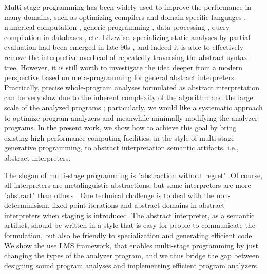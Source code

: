 Multi-stage programming has been widely used to improve the performance in many domains, 
such as optimizing compilers and domain-specific languages \cite{DBLP:conf/pldi/RompfSBLCO14, DBLP:conf/snapl/RompfBLSJAOSKDK15,
DBLP:journals/tecs/SujeethBLRCOO14, DBLP:conf/gpce/SujeethGBLROO13, DBLP:journals/jfp/CaretteKS09},
numerical computation \cite{PGL-038, DBLP:conf/pepm/AktemurKKS13}, 
generic programming \cite{DBLP:journals/pacmpl/Yallop17, Ofenbeck:2017:SGP:3136040.3136060}, 
data processing \cite{DBLP:conf/oopsla/JonnalageddaCSRO14, DBLP:conf/popl/KiselyovBPS17}, 
query compilation in databases \cite{DBLP:conf/osdi/EssertelTDBOR18, DBLP:conf/sigmod/TahboubER18},
etc.
Likewise, specializing static analyses by partial evaluation had been emerged in late 90s 
\cite{damian1999partial, amtoft1999partial, Boucher:1996:ACN:647473.727587, ashley:practical}, 
and indeed it is able to effectively remove the interpretive overhead of 
repeatedly traversing the abstract syntax tree. However, it is still worth 
to investigate the idea deeper from a modern perspective based on meta-programming 
for general abstract interpreters. 
Practically, precise whole-program analyses formulated as abstract interpretation 
can be very slow due to the inherent complexity of the algorithm and the large scale 
of the analyzed programs \cite{toman_et_al:LIPIcs:2017:7121} ;
particularly, we would like a systematic approach to optimize program 
analyzers and meanwhile minimally modifying the analyzer programs.
In the present work, we show how to achieve this goal by bring existing 
high-performance computing facilities, in the style of multi-stage generative
programming, to abstract interpretation semantic artifacts, i.e., 
abstract interpreters. 

The slogan of multi-stage programming is "abstraction without regret". 
Of course, all interpreters are metalinguistic abstractions, but some interpreters are more "abstract"
than others . 
One technical challenge is to deal with the non-determinisism, fixed-point iterations and abstract 
domains in abstract interpreters when staging is introduced. The abstract interpreter, as a semantic artifact, 
should be written in a style that is easy for people to communicate the formulation, but also be friendly
to specialization and generating efficient code. 
We show the use LMS framework, that enables multi-stage programming by just changing the types 
of the analyzer program, and we thus bridge the gap between designing sound program analyses 
and implementing efficient program analyzers. 

